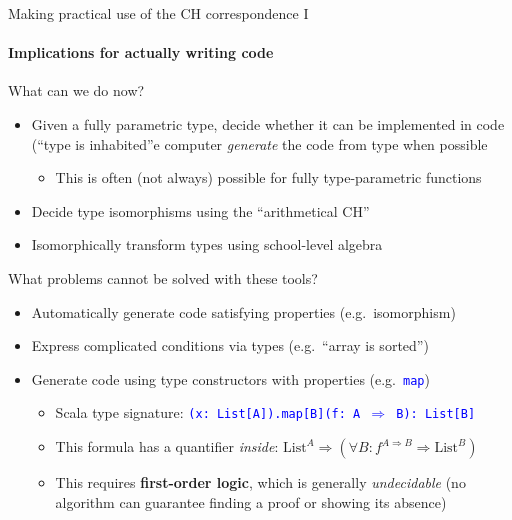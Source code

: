 \documentclass[english]{beamer}
\begin{document}
\begin{frame}{Making practical use of the CH correspondence I}


\framesubtitle{Implications for actually writing code}

What can we do now?
\begin{itemize}
\item Given a fully parametric type, decide whether it can be implemented
in code (``type is inhabited''e computer \emph{generate} the code from type when possible
\begin{itemize}
\item This is often (not always) possible for fully type-parametric functions
\end{itemize}
\item Decide type isomorphisms using the ``arithmetical CH''
\item Isomorphically transform types using school-level algebra
\end{itemize}
What problems cannot be solved with these tools?
\begin{itemize}
\item Automatically generate code satisfying properties (e.g.\ isomorphism) 
\item Express complicated conditions via types (e.g.\ ``array is sorted'') 
\item Generate code using type constructors with properties (e.g.\ \texttt{\textcolor{blue}{\footnotesize{}map}})
\begin{itemize}
\item Scala type signature: \texttt{\textcolor{blue}{\footnotesize{}(x:\ List{[}A{]}).map{[}B{]}(f:\ A
$\Rightarrow$ B):\ List{[}B{]}}}{\footnotesize \par}
\item This formula has a quantifier \emph{inside}: $\text{List}^{A}\Rightarrow(\forall B:f^{A\Rightarrow B}\Rightarrow\text{List}^{B})$
\item This requires \textbf{first-order logic}, which is generally \emph{undecidable}
(no algorithm can guarantee finding a proof or showing its absence)
\end{itemize}
\end{itemize}
\end{frame}
\end{document}
